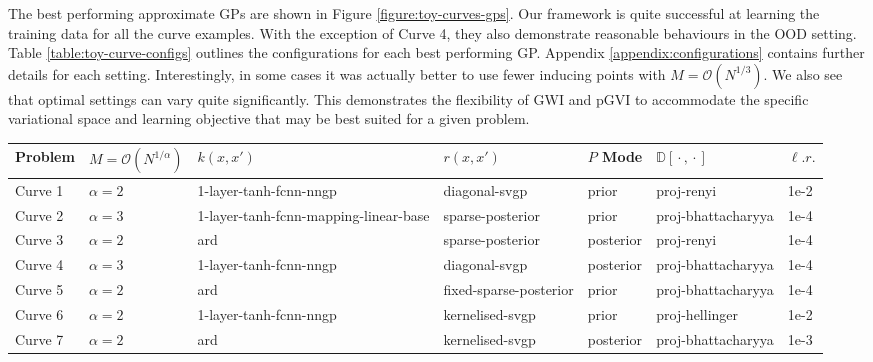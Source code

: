 \documentclass{article}
\newcommand{\wc}{\operatorname{{}\cdot{}}}
\numberwithin{equation}{section}
\begin{document}
The best performing approximate GPs are shown in Figure \ref{figure:toy-curves-gps}. Our framework is quite successful at learning the training data for all the curve examples.
With the exception of Curve 4, they also demonstrate reasonable behaviours in the OOD setting. 
Table \ref{table:toy-curve-configs} outlines the configurations for each best performing GP. 
Appendix \ref{appendix:configurations} contains further details for each setting.
Interestingly, in some cases it was actually better to use fewer inducing points with $M = \mathcal{O}(N^{1/3})$.
We also see that optimal settings can vary quite significantly.
This demonstrates the flexibility of GWI and pGVI to accommodate the specific variational space and learning objective that may be best suited for a given problem.


\begin{table}[h!]
\tiny
\centering
\begin{tabular}{lllllll}
\toprule
Problem &  $M = \mathcal{O}(N^{1/\alpha})$  &                      $k(x, x')$ &       $r(x, x')$ & $P$ Mode &   $\mathbb{D}[\wc, \wc]$ &  $\ell. r.$ \\
\midrule
 Curve 1  &                       $\alpha=2$ &                1-layer-tanh-fcnn-nngp &          diagonal-svgp &          prior &         proj-renyi &      1e-2 \\
 Curve 2  &                       $\alpha=3$ & 1-layer-tanh-fcnn-mapping-linear-base &       sparse-posterior &          prior & proj-bhattacharyya &      1e-4 \\
 Curve 3  &                       $\alpha=2$ &                                  ard &       sparse-posterior &      posterior &         proj-renyi &      1e-4 \\
 Curve 4  &                       $\alpha=3$ &                1-layer-tanh-fcnn-nngp &          diagonal-svgp &      posterior & proj-bhattacharyya &      1e-4 \\
 Curve 5  &                       $\alpha=2$ &                                  ard & fixed-sparse-posterior &          prior & proj-bhattacharyya &      1e-4 \\
 Curve 6  &                       $\alpha=2$ &                1-layer-tanh-fcnn-nngp &        kernelised-svgp &          prior &     proj-hellinger &      1e-2 \\
 Curve 7  &                       $\alpha=2$ &                                  ard &        kernelised-svgp &      posterior & proj-bhattacharyya &      1e-3 \\

\end{tabular}
\end{table}
\end{document}
